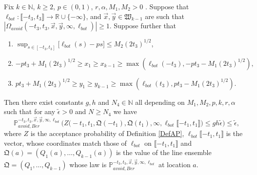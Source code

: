 \begin{lemma}\label{LemmaAP1} Fix $k \in \mathbb{N}$, $k \geq 2$, $p \in (0,1)$, $r, \alpha, M_1, M_2 > 0$ . Suppose that $\ell_{bot}: \llbracket -t_3, t_3 \rrbracket \rightarrow \mathbb{R} \cup \{ - \infty \}$, and $\vec{x}, \vec{y} \in \mathfrak{W}_{k-1}$ are such that $|\Omega_{avoid}(-t_3, t_3, \vec{x}, \vec{y}, \infty, \ell_{bot})| \geq 1$. Suppose further that
	\begin{enumerate}
		\item $\sup_{s \in [- t_3,t_3]}\big[\ell_{bot}(s)  - ps \big]  \leq M_2 (2t_3)^{1/2}$,
		\item  $-pt_3 + M_1 (2t_3)^{1/2} \geq  x_1 \geq  x_{k-1} \geq \max\left(\ell_{bot}(-t_3), -pt_3- M_1 (2t_3)^{1/2}\right),$
		\item $pt_3 + M_1 (2t_3)^{1/2} \geq y_1 \geq y_{k-1} \geq  \max \left( \ell_{bot}(t_3),  p t_3- M_1(2t_3)^{1/2} \right).$
	\end{enumerate}
	Then there exist constants $g,h$ and $N_4 \in \mathbb{N}$ all depending on $ M_1, M_2, p , k, r, \alpha$   such that for any $\tilde{\epsilon}  > 0$ and $N \geq N_4$ we have
	\begin{equation}\label{eqn60}
	\mathbb{P}^{-t_3, t_3, \vec{x},\vec{y}, \infty, \ell_{bot} }_{avoid, Ber} \Big( Z\big(  -t_1, t_1, \mathfrak{Q}(-t_1) ,\mathfrak{Q}(t_1), \infty,  \ell_{bot}\llbracket -t_1, t_1\rrbracket\big) \leq  gh \tilde{\epsilon}   \Big)  \leq \tilde{\epsilon},
	\end{equation}
	where $Z$ is the acceptance probability of Definition \ref{DefAP}, $\ell_{bot}\llbracket -t_1, t_1\rrbracket$ is the vector, whose coordinates match those of $\ell_{bot}$ on $\llbracket -t_1, t_1\rrbracket$ and $\mathfrak{Q}(a) = (Q_1(a), \dots, Q_{k-1}(a))$ is the value of the line ensemble $\mathfrak{Q} = (Q_1, \dots, Q_{k-1})$ whose law is $\mathbb{P}^{-t_3, t_3, \vec{x},\vec{y}, \infty, \ell_{bot} }_{avoid, Ber}$ at location $a$.
\end{lemma}


